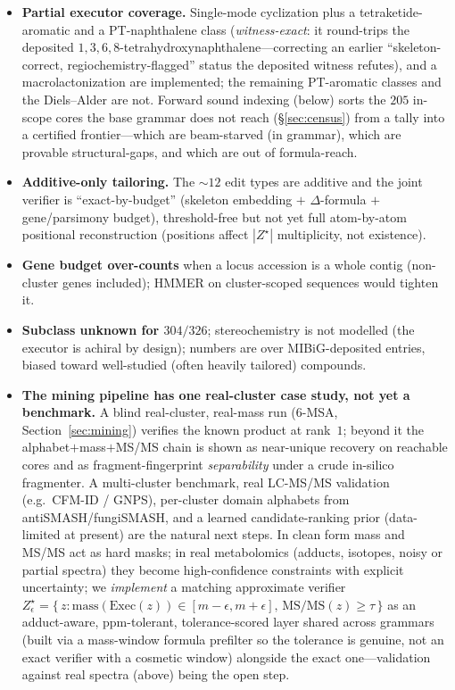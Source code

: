 \documentclass[11pt]{article}
\theoremstyle{definition}
\newcommand{\zstar}{\ensuremath{Z^{\star}}}
\begin{document}
\begin{itemize}[leftmargin=1.4em,itemsep=2pt]
\item \textbf{Partial executor coverage.} Single-mode cyclization plus a tetraketide-aromatic and
a PT-naphthalene class (\emph{witness-exact}: it round-trips the deposited
$1,3,6,8$-tetrahydroxynaphthalene---correcting an earlier ``skeleton-correct, regiochemistry-flagged''
status the deposited witness refutes), and a macrolactonization are implemented; the
remaining PT-aromatic classes and the Diels--Alder are not. Forward sound indexing (below) sorts the
$205$ in-scope cores the base grammar does not reach (\S\ref{sec:census}) from a tally into a certified
frontier---which are beam-starved (in grammar), which are provable structural-gaps, and which are out of
formula-reach.
\item \textbf{Additive-only tailoring.} The $\sim\!12$ edit types are additive and the joint
verifier is ``exact-by-budget'' (skeleton embedding $+$ $\Delta$-formula $+$ gene/parsimony
budget), threshold-free but not yet full atom-by-atom positional reconstruction (positions affect
$|\zstar|$ multiplicity, not existence).
\item \textbf{Gene budget over-counts} when a locus accession is a whole contig (non-cluster
genes included); HMMER on cluster-scoped sequences would tighten it.
\item \textbf{Subclass unknown for $304/326$}; stereochemistry is not modelled (the executor is
achiral by design); numbers are over MIBiG-deposited entries, biased toward well-studied (often
heavily tailored) compounds.
\item \textbf{The mining pipeline has one real-cluster case study, not yet a benchmark.} A blind
real-cluster, real-mass run (6-MSA, Section~\ref{sec:mining}) verifies the known product at rank~$1$;
beyond it the alphabet$+$mass$+$MS/MS chain is shown as near-unique recovery on reachable cores and
as fragment-fingerprint \emph{separability} under a crude in-silico fragmenter. A multi-cluster
benchmark, real LC-MS/MS validation (e.g.\ CFM-ID / GNPS), per-cluster domain alphabets from
antiSMASH/fungiSMASH, and a learned candidate-ranking prior (data-limited at present) are the
natural next steps. In clean form mass and MS/MS act as hard masks; in real metabolomics (adducts,
isotopes, noisy or partial spectra) they become high-confidence constraints with explicit
uncertainty; we \emph{implement} a matching approximate verifier
$Z^{\star}_{\epsilon}=\{\,z:\mathrm{mass}(\mathrm{Exec}(z))\in[m-\epsilon,m+\epsilon],\,
\mathrm{MS/MS}(z)\ge\tau\,\}$ as an adduct-aware, ppm-tolerant, tolerance-scored layer shared across
grammars (built via a mass-window formula prefilter so the tolerance is genuine, not an exact
verifier with a cosmetic window) alongside the exact one---validation against real spectra (above)
being the open step.
\end{itemize}
\end{document}
